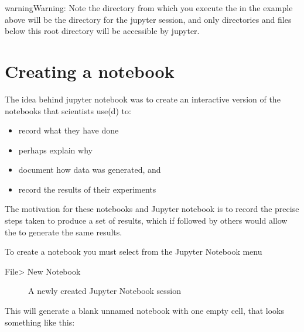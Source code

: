 \documentclass[letterpaper,10pt,english]{jupyterBook}
\let\sphinxpxdimen\pdfpxdimen\else\newdimen\sphinxpxdimen
\begin{document}
\begin{sphinxadmonition}{warning}{Warning:}
\sphinxAtStartPar
Note the directory from which you execute the   in the example above will be the  directory for the jupyter session, and only directories and files below this root directory will be accessible by jupyter.
\end{sphinxadmonition}


\section{Creating a notebook}
\label{\detokenize{content/04_PythonEssentials/Intro_Jupyter_notebook:creating-a-notebook}}
\sphinxAtStartPar
The idea behind jupyter notebook was to create an interactive version of the notebooks that scientists use(d) to:
\begin{itemize}
\item {} 
\sphinxAtStartPar
record what they have done

\item {} 
\sphinxAtStartPar
perhaps explain why

\item {} 
\sphinxAtStartPar
document how data was generated, and

\item {} 
\sphinxAtStartPar
record the results of their experiments

\end{itemize}

\sphinxAtStartPar
The motivation for these notebooks and Jupyter notebook is to record the precise steps taken to produce a set of results, which if followed by others would allow the to generate the same results.

\sphinxAtStartPar
To create a notebook you must select from the Jupyter Notebook menu

\sphinxAtStartPar
File\sphinxhyphen{}> New Notebook

\begin{figure}[htbp]
\centering
\capstart

\noindent\sphinxincludegraphics[height=150\sphinxpxdimen]{{NewNotebook}.png}
\caption{A newly created Jupyter Notebook session}\label{\detokenize{content/04_PythonEssentials/Intro_Jupyter_notebook:new-notebook}}\end{figure}

\sphinxAtStartPar
This will generate a blank unnamed notebook with one empty cell, that looks something like this:
\end{document}
